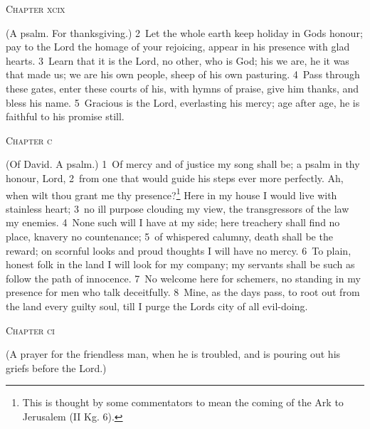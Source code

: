 \documentclass[10pt]{book} %
\begin{document}
\begin{large}\begin{center}\textsc{Chapter xcix}\end{center}\end{large}
(A psalm. For thanksgiving.)
\textcolor{benred8}{2}~Let the whole earth keep holiday in God\textquotesingle s honour; pay to the Lord the homage of your rejoicing, appear in his presence with glad hearts. \textcolor{benred8}{3}~Learn that it is the Lord, no other, who is God; his we are, he it was that made us; we are his own people, sheep of his own pasturing. \textcolor{benred8}{4}~Pass through these gates, enter these courts of his, with hymns of praise, give him thanks, and bless his name. \textcolor{benred8}{5}~Gracious is the Lord, everlasting his mercy; age after age, he is faithful to his promise still.
\begin{large}\begin{center}\textsc{Chapter c}\end{center}\end{large}
(Of David. A psalm.)
\textcolor{benred8}{1}~Of mercy and of justice my song shall be; a psalm in thy honour, Lord, \textcolor{benred8}{2}~from one that would guide his steps ever more perfectly. Ah, when wilt thou grant me thy presence?\footnote[1]{This is thought by some commentators to mean the coming of the Ark to Jerusalem (II Kg. 6).} Here in my house I would live with stainless heart; \textcolor{benred8}{3}~no ill purpose clouding my view, the transgressors of the law my enemies. \textcolor{benred8}{4}~None such will I have at my side; here treachery shall find no place, knavery no countenance; \textcolor{benred8}{5}~of whispered calumny, death shall be the reward; on scornful looks and proud thoughts I will have no mercy. \textcolor{benred8}{6}~To plain, honest folk in the land I will look for my company; my servants shall be such as follow the path of innocence. \textcolor{benred8}{7}~No welcome here for schemers, no standing in my presence for men who talk deceitfully. \textcolor{benred8}{8}~Mine, as the days pass, to root out from the land every guilty soul, till I purge the Lord\textquotesingle s city of all evil-doing.
\begin{large}\begin{center}\textsc{Chapter ci}\end{center}\end{large}
(A prayer for the friendless man, when he is troubled, and is pouring out his griefs before the Lord.)
\end{document}
